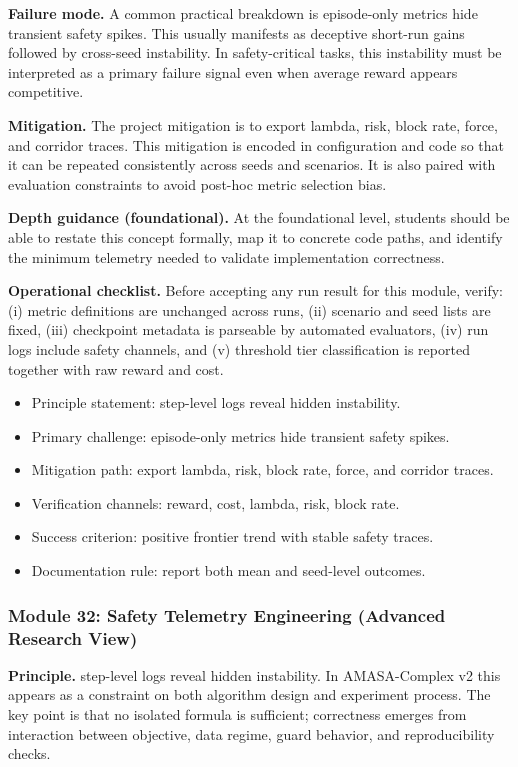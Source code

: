 \documentclass[conference]{IEEEtran}
\begin{document}
\textbf{Failure mode.} A common practical breakdown is episode-only metrics hide transient safety spikes. This usually manifests as deceptive short-run gains followed by cross-seed instability. In safety-critical tasks, this instability must be interpreted as a primary failure signal even when average reward appears competitive.

\textbf{Mitigation.} The project mitigation is to export lambda, risk, block rate, force, and corridor traces. This mitigation is encoded in configuration and code so that it can be repeated consistently across seeds and scenarios. It is also paired with evaluation constraints to avoid post-hoc metric selection bias.

\textbf{Depth guidance (foundational).} At the foundational level, students should be able to restate this concept formally, map it to concrete code paths, and identify the minimum telemetry needed to validate implementation correctness.

\textbf{Operational checklist.} Before accepting any run result for this module, verify: (i) metric definitions are unchanged across runs, (ii) scenario and seed lists are fixed, (iii) checkpoint metadata is parseable by automated evaluators, (iv) run logs include safety channels, and (v) threshold tier classification is reported together with raw reward and cost.

\begin{itemize}[leftmargin=*]
  \item Principle statement: step-level logs reveal hidden instability.
  \item Primary challenge: episode-only metrics hide transient safety spikes.
  \item Mitigation path: export lambda, risk, block rate, force, and corridor traces.
  \item Verification channels: reward, cost, lambda, risk, block rate.
  \item Success criterion: positive frontier trend with stable safety traces.
  \item Documentation rule: report both mean and seed-level outcomes.
\end{itemize}


\subsubsection{Module 32: Safety Telemetry Engineering (Advanced Research View)}
\textbf{Principle.} step-level logs reveal hidden instability. In AMASA-Complex v2 this appears as a constraint on both algorithm design and experiment process. The key point is that no isolated formula is sufficient; correctness emerges from interaction between objective, data regime, guard behavior, and reproducibility checks.
\end{document}

